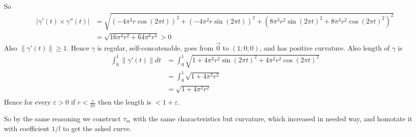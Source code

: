 \documentclass[12pt,a4paper]{article}
\begin{document}
\begin{problem}{72}
\begin{enumerate}
\[                \]
                So
                \begin{align*}
                    |\gamma'(t) \times \gamma''(t)|
                    &= \sqrt{(-4\pi^2 r \cos(2\pi t))^2 + (-4\pi^2 r \sin(2\pi t))^2 + (8\pi^3 r^2 \sin(2\pi t)^2 + 8\pi^3 r^2 \cos(2\pi t)^2)^2}\\
                    &= \sqrt{16\pi^4 r^2 + 64\pi^6 r^4} > 0
                \end{align*}
                Also $\|\gamma'(t)\| \geqslant 1$. Hence $\gamma$ is regular, self-concatenable, goes from $\vec{0}$ to $(1; 0; 0)$, and has positive curvature. Also length of $\gamma$ is
                \begin{align*}
                    \int_0^1 \|\gamma'(t)\| dt
                    &= \int_0^1 \sqrt{1 + 4 \pi^2 r^2 \sin(2\pi t)^2 + 4 \pi^2 r^2 \cos(2\pi t)^2}\\
                    &= \int_0^1 \sqrt{1 + 4 \pi^2 r^2}\\
                    &= \sqrt{1 + 4 \pi^2 r^2}\\
                \end{align*}
                Hence for every $\varepsilon > 0$ if $r < \frac{\varepsilon}{2\pi}$ then the length is $< 1 + \varepsilon$.
                
                So by the same reasoning we construct $\tau_m$ with the same characteristics but curvature, which increased in needed way, and homotate it with coefficient $1/l$ to get the asked curve.
        \end{enumerate}
    \end{problem}
\end{document}
